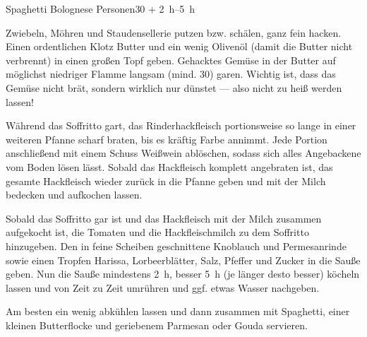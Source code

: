 \begin{MyRecipe}{Spaghetti Bolognese}{ Personen}{\SI{30}{\minuteprime} + \SIrange{2}{5}{\hour}}
	
	
	Zwiebeln, Möhren und Staudensellerie putzen bzw. schälen, ganz fein hacken. Einen ordentlichen Klotz Butter und ein wenig Olivenöl (damit die Butter nicht verbrennt) in einen großen Topf geben. Gehacktes Gemüse in der Butter auf möglichst niedriger Flamme langsam (mind. \SI{30}{\minuteprime}) garen. Wichtig ist, dass das Gemüse nicht brät, sondern wirklich nur dünstet --- also nicht zu heiß werden lassen!\par\bigskip
	
	
	Während das Soffritto gart, das Rinderhackfleisch portionsweise so lange in einer weiteren Pfanne scharf braten, bis es kräftig Farbe annimmt. Jede Portion  anschließend mit einem Schuss Weißwein ablöschen, sodass sich alles Angebackene vom Boden lösen lässt. Sobald das Hackfleisch komplett angebraten ist, das gesamte Hackfleisch wieder zurück in die Pfanne geben und mit der Milch bedecken und aufkochen lassen.\par\bigskip

	
	Sobald das Soffritto gar ist und das Hackfleisch mit der Milch zusammen aufgekocht ist, die Tomaten und die Hackfleischmilch zu dem Soffritto hinzugeben. Den in feine Scheiben geschnittene Knoblauch und Permesanrinde sowie einen Tropfen Harissa, Lorbeerblätter, Salz, Pfeffer und Zucker in die Sauße geben. Nun die Sauße mindestens \SI{2}{\hour}, besser \SI{5}{\hour} (je länger desto besser) köcheln lassen und von Zeit zu Zeit umrühren und ggf. etwas Wasser nachgeben.
		
	
	Am besten ein wenig abkühlen lassen und dann zusammen mit Spaghetti, einer kleinen Butterflocke und geriebenem Parmesan oder Gouda servieren.
	
	
\end{MyRecipe}
